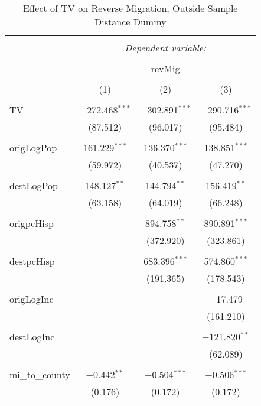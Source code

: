 
\begin{table}[!htbp] \centering 
  \caption{Effect of TV on Reverse Migration, Outside Sample Distance Dummy} 
  \label{} 
\begin{tabular}{@{\extracolsep{5pt}}lccc} 
\\[-1.8ex]\hline 
\hline \\[-1.8ex] 
 & \multicolumn{3}{c}{\textit{Dependent variable:}} \\ 
\cline{2-4} 
\\[-1.8ex] & \multicolumn{3}{c}{revMig} \\ 
\\[-1.8ex] & (1) & (2) & (3)\\ 
\hline \\[-1.8ex] 
 TV & $-$272.468$^{***}$ & $-$302.891$^{***}$ & $-$290.716$^{***}$ \\ 
  & (87.512) & (96.017) & (95.484) \\ 
  & & & \\ 
 origLogPop & 161.229$^{***}$ & 136.370$^{***}$ & 138.851$^{***}$ \\ 
  & (59.972) & (40.537) & (47.270) \\ 
  & & & \\ 
 destLogPop & 148.127$^{**}$ & 144.794$^{**}$ & 156.419$^{**}$ \\ 
  & (63.158) & (64.019) & (66.248) \\ 
  & & & \\ 
 origpcHisp &  & 894.758$^{**}$ & 890.891$^{***}$ \\ 
  &  & (372.920) & (323.861) \\ 
  & & & \\ 
 destpcHisp &  & 683.396$^{***}$ & 574.860$^{***}$ \\ 
  &  & (191.365) & (178.543) \\ 
  & & & \\ 
 origLogInc &  &  & $-$17.479 \\ 
  &  &  & (161.210) \\ 
  & & & \\ 
 destLogInc &  &  & $-$121.820$^{**}$ \\ 
  &  &  & (62.089) \\ 
  & & & \\ 
 mi\_to\_county & $-$0.442$^{**}$ & $-$0.504$^{***}$ & $-$0.506$^{***}$ \\ 
  & (0.176) & (0.172) & (0.172) \\ 

\end{tabular}
\end{table}
